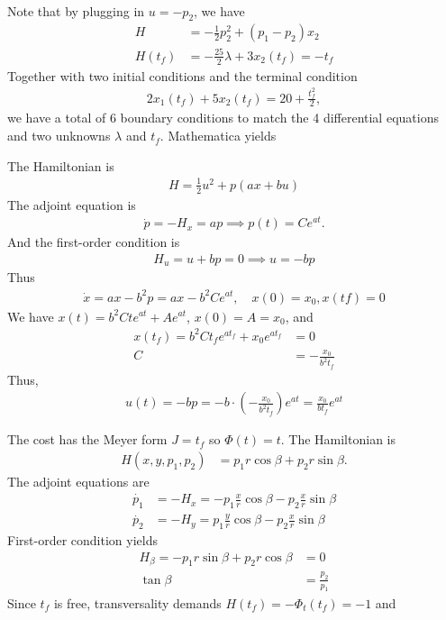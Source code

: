 \documentclass[12pt]{article}
\begin{document}
\begin{problem}[1]
\begin{enumerate}[label=(\alph*)]
\begin{align*}
\end{align*}
Note that by plugging in $ u=-p_2$, we have
\begin{align*}
	H &= -\frac{1}{2} p_2^2+(p_1-p_2)x_2\\
	H(t_f)&= -\frac{25}{2} \lambda + 3x_2(t_f) = -t_f 
\end{align*}
Together with two initial conditions and the terminal condition
\begin{align*}
	2x_1(t_f) +5x_2(t_f) = 20 + \frac{t_f^2}{ 2},
\end{align*}
we have a total of 6 boundary conditions to match the 4 differential equations and two unknowns $ \lambda$ and $ t_f$. Mathematica yields
\end{enumerate}
\end{problem}
\begin{problem}[2]
The Hamiltonian is
\begin{align*}
	H = \frac{1}{2} u^2 + p(ax+bu)
\end{align*}
The adjoint equation is
\begin{align*}
	\dot{p} = -H_x = ap \implies p(t) = C e^{at}.
\end{align*}
And the first-order condition is
\begin{align*}
	H_u = u+bp = 0 \implies u=-bp
\end{align*}
Thus
\begin{align*}
	\dot{x} = ax-b^2p = ax - b^2 C e^{at}, \quad x(0)=x_0,x(tf) = 0
\end{align*}
We have $ x(t) = b^2 C t e^{at} + A e^{at}$, $ x(0) = A = x_0$, and
\begin{align*}
	x(t_f) = b^2 C t_f e^{at_f} + x_0 e^{at_f} &= 0 \\
	C &= - \frac{x_0}{ b^2 t_f}
\end{align*}
Thus,
\begin{align*}
	u(t) = -bp = -b \cdot \left( - \frac{x_0}{b^2 t_f} \right) e^{at}  = \frac{x_0}{ b t_f} e^{at}
\end{align*}
\end{problem}

\begin{problem}[5]
The cost has the Meyer form $ J = t_f$ so  $ \Phi(t) = t$. The Hamiltonian is
\begin{align*}
	H(x,y,p_1,p_2) &= p_1 r \cos \beta + p_2 r \sin \beta .
\end{align*}
The adjoint equations are
\begin{align*}
	\dot{p_1} &= -H_x = - p_1 \frac{x}{r} \cos \beta - p_2 \frac{x}{r} \sin \beta \\
	\dot{p_2} &= -H_y = p_1 \frac{y}{r} \cos \beta - p_2 \frac{x}{r} \sin \beta 
\end{align*}
First-order condition yields
\begin{align*}
	H_{\beta} = -p_1 r \sin \beta + p_2 r \cos \beta &= 0 \\
	\tan \beta &= \frac{p_2}{p_1} 
\end{align*}
Since $ t_f$ is free, transversality demands $ H(t_f) = - \Phi_t(t_f) = -1$ and 
\end{problem}
\end{document}

